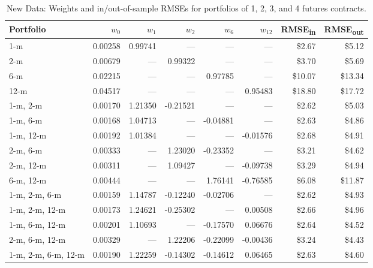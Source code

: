\documentclass{article}
\begin{document}
\begin{table}[h!]
\centering
\setlength{\tabcolsep}{4pt} %
\begin{tabular}{lrrrrrrr}
\toprule
\textbf{Portfolio} & \textbf{$w_0$} & \textbf{$w_1$} & \textbf{$w_2$} & \textbf{$w_6$} & \textbf{$w_{12}$} & \textbf{RMSE\textsubscript{in}} & \textbf{RMSE\textsubscript{out}} \\
\midrule
1-m & \phantom{-}0.00258 & \phantom{-}0.99741 & --- & --- & --- & \$2.67 & \$5.12 \\
2-m & \phantom{-}0.00679 & --- & \phantom{-}0.99322 & --- & --- & \$3.70 & \$5.69 \\
6-m & \phantom{-}0.02215 & --- & --- & \phantom{-}0.97785 & --- & \$10.07 & \$13.34 \\
12-m & \phantom{-}0.04517 & --- & --- & --- & \phantom{-}0.95483 & \$18.80 & \$17.72 \\
\midrule
1-m, 2-m & \phantom{-}0.00170 & \phantom{-}1.21350 & -0.21521 & --- & --- & \$2.62 & \$5.03 \\
1-m, 6-m & \phantom{-}0.00168 & \phantom{-}1.04713 & --- & -0.04881 & --- & \$2.63 & \$4.86 \\
1-m, 12-m & \phantom{-}0.00192 & \phantom{-}1.01384 & --- & --- & -0.01576 & \$2.68 & \$4.91 \\
2-m, 6-m & \phantom{-}0.00333 & --- & \phantom{-}1.23020 & -0.23352 & --- & \$3.21 & \$4.62 \\
2-m, 12-m & \phantom{-}0.00311 & --- & \phantom{-}1.09427 & --- & -0.09738 & \$3.29 & \$4.94 \\
6-m, 12-m & \phantom{-}0.00444 & --- & --- & \phantom{-}1.76141 & -0.76585 & \$6.08 & \$11.87 \\
\midrule
1-m, 2-m, 6-m & \phantom{-}0.00159 & \phantom{-}1.14787 & -0.12240 & -0.02706 & --- & \$2.62 & \$4.93 \\
1-m, 2-m, 12-m & \phantom{-}0.00173 & \phantom{-}1.24621 & -0.25302 & --- & \phantom{-}0.00508 & \$2.66 & \$4.96 \\
1-m, 6-m, 12-m & \phantom{-}0.00201 & \phantom{-}1.10693 & --- & -0.17570 & \phantom{-}0.06676 & \$2.64 & \$4.52 \\
2-m, 6-m, 12-m & \phantom{-}0.00329 & --- & \phantom{-}1.22206 & -0.22099 & -0.00436 & \$3.24 & \$4.43 \\
\midrule
1-m, 2-m, 6-m, 12-m & \phantom{-}0.00190 & \phantom{-}1.22259 & -0.14302 & -0.14612 & \phantom{-}0.06465 & \$2.63 & \$4.60 \\
\bottomrule
\end{tabular}
\caption{New Data: Weights and in/out-of-sample RMSEs for portfolios of 1, 2, 3, and 4 futures contracts.}
\label{tab:new_data_rmse}
\end{table}
\end{document}
